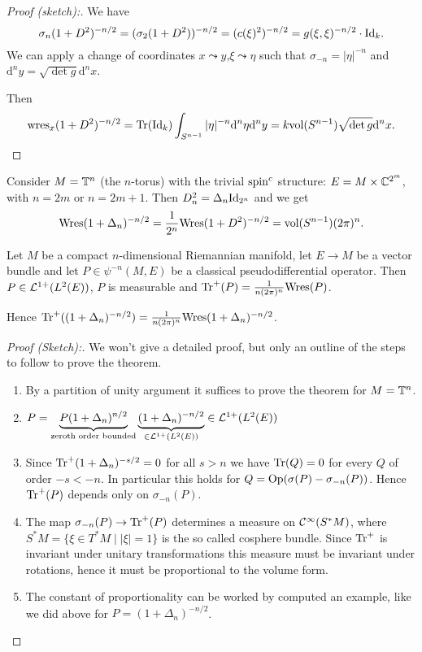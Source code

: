 \begin{proof}[Proof (sketch):] We have $$\sigma_n(1+D^2)^{-n/2}=(\sigma_2(1+D^2))^{-n/2}=(c(\xi)^2)^{-n/2}=g(\xi,\xi)^{-n/2}\cdot\mathrm{Id}_k.$$
 We can apply a change of coordinates $x\leadsto y$,$\xi\leadsto\eta$ such that $\sigma_{-n}=|\eta|^{-n}$ and $\mathrm{d}^ny=\sqrt{\det g}\mathrm{d}^nx$. 
 
 \noindent Then $$\mathrm{wres}_x(1+D^2)^{-n/2}=\mathrm{Tr}(\mathrm{Id}_k)\int_{S^{n-1}}|\eta|^{-n}\mathrm{d}^n\eta\mathrm{d}^ny=k\mathrm{vol}(S^{n-1})\sqrt{\det g}\mathrm{d}^nx.$$
\end{proof}

\begin{example}
 Consider $M=\mathbb{T}^n$ (the $n$-torus) with the trivial $\mathrm{spin}^c$ structure: $E=M\times\mathbb{C}^{2^m}$, with $n=2m$ or $n=2m+1$. Then $D_n^2=\Delta_n\mathrm{Id}_{2^n}$ and we get $$\mathrm{Wres}(1+\Delta_n)^{-n/2}=\frac1{2^n}\mathrm{Wres}(1+D^2)^{-n/2}=\mathrm{vol}(S^{n-1})(2\pi)^n.$$
\end{example}


\begin{theorem}
 Let $M$ be a compact $n$-dimensional Riemannian manifold, let $E\to M$ be a vector bundle and let $P\in\psi^{-n}(M,E)$ be a classical pseudodifferential operator. Then $P\in\mathcal{L}^{1+}(L^2(E))$, $P$ is measurable and $\mathrm{Tr}^+(P)=\frac{1}{n(2\pi)^n}\mathrm{Wres}(P)$.
 
 \noindent Hence $\mathrm{Tr}^+((1+\Delta_n)^{-n/2})=\frac1{n(2\pi)^n}\mathrm{Wres}(1+\Delta_n)^{-n/2}$.
\end{theorem}

\begin{proof}[Proof (Sketch):]
 We won't give a detailed proof, but only an outline of the steps to follow to prove the theorem.
 \begin{enumerate}
  \item By a partition of unity argument it suffices to prove the theorem for $M=\mathbb{T}^n$.
  \item $P=\underbrace{P(1+\Delta_n)^{n/2}}_{\text{zeroth order bounded}}\underbrace{(1+\Delta_n)^{-n/2}}_{\in\mathcal{L}^{1+}(L^2(E))}\in\mathcal{L}^{1+}(L^2(E))$
  \item Since $\mathrm{Tr}^+(1+\Delta_n)^{-s/2}=0$ for all $s>n$ we have $\mathrm{Tr}(Q)=0$ for every $Q$ of order $-s<-n$. In particular this holds for $Q=\mathrm{Op}(\sigma(P)-\sigma_{-n}(P))$. Hence $\mathrm{Tr}^+(P)$ depends only on $\sigma_{-n}(P)$.
  \item The map $\sigma_{-n}(P)\to\mathrm{Tr}^+(P)$ determines a measure on $\mathcal{C}^\infty(S^\ast M)$, where $S^\ast M=\{\xi\in T^\ast M\mid |\xi|=1\}$ is the so called cosphere bundle. Since $\mathrm{Tr}^+$ is invariant under unitary transformations this measure must be invariant under rotations, hence it must be proportional to the volume form.
  \item The constant of proportionality can be worked by computed an example, like we did above for $P=(1+\Delta_n)^{-n/2}$.
 \end{enumerate}
\end{proof}

